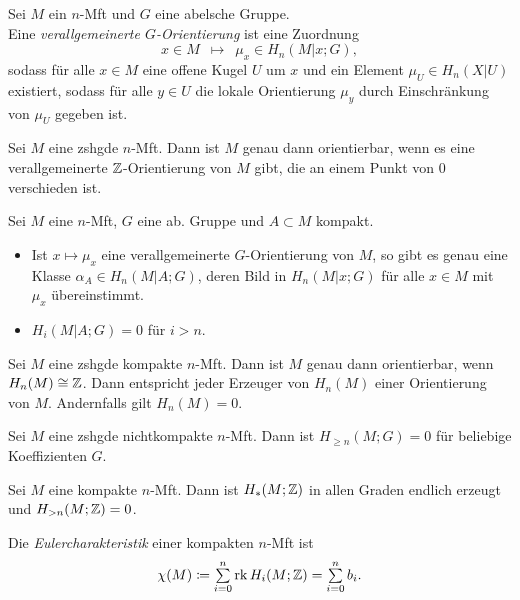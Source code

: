 \documentclass{cheat-sheet}
\DeclareMathOperator{\rk}{rk} %
\begin{document}
\begin{defn}
  Sei $M$ ein $n$-Mft und $G$ eine abelsche Gruppe. \\
  Eine \emph{verallgemeinerte $G$-Orientierung} ist eine Zuordnung
  \[ x \in M \enspace\mapsto\enspace \mu_x \in H_n(M|x; G), \]
  sodass für alle $x \in M$ eine offene Kugel $U$ um $x$ und ein Element $\mu_U \in H_n(X|U)$ existiert, sodass für alle $y \in U$ die lokale Orientierung $\mu_y$ durch Einschränkung von $\mu_U$ gegeben ist.
\end{defn}

\begin{prop}
  Sei $M$ eine zshgde $n$-Mft. Dann ist $M$ genau dann orientierbar, wenn es eine verallgemeinerte $\mathbb{Z}$-Orientierung von $M$ gibt, die an einem Punkt von $0$ verschieden ist.
\end{prop}

\begin{lem}
  Sei $M$ eine $n$-Mft, $G$ eine ab. Gruppe und $A {\subset} M$ kompakt.
  \begin{itemize}
    \item Ist $x \mapsto \mu_x$ eine verallgemeinerte $G$-Orientierung von $M$, so gibt es genau eine Klasse $\alpha_A \in H_n(M|A; G)$, deren Bild in $H_n(M|x; G)$ für alle $x \in M$ mit $\mu_x$ übereinstimmt.
    \item $H_i(M|A; G) = 0$ für $i > n$.
  \end{itemize}
\end{lem}


\begin{kor}
  Sei $M$ eine zshgde kompakte $n$-Mft. Dann ist $M$ genau dann orientierbar, wenn $H_n(M) \cong \mathbb{Z}$. Dann entspricht jeder Erzeuger von $H_n(M)$ einer Orientierung von $M$. Andernfalls gilt $H_n(M) = 0$.
\end{kor}

\begin{prop}
  Sei $M$ eine zshgde nichtkompakte $n$-Mft. Dann ist $H_{\geq n}(M; G) = 0$ für beliebige Koeffizienten $G$.
\end{prop}


\begin{satz}
  Sei $M$ eine kompakte $n$-Mft. Dann ist $H_*(M;\mathbb{Z})$ in allen Graden endlich erzeugt und $H_{>n}(M; \mathbb{Z}) = 0$.
\end{satz}

\begin{defn}
  Die \emph{Eulercharakteristik} einer kompakten $n$-Mft ist
  \[ \chi(M) \coloneqq \sum_{i=0}^n \rk H_i(M; \Z) = \sum_{i=0}^n b_i. \]
\end{defn}
\end{document}
